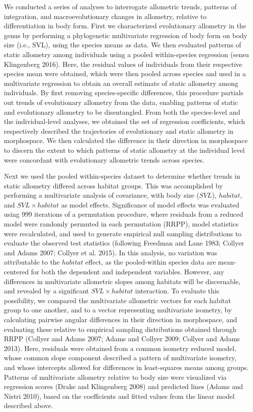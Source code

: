\documentclass[
  11pt,
]{article}
\begin{document}
We conducted a series of analyses to interrogate allometric trends,
patterns of integration, and macroevolutionary changes in allometry,
relative to differentiation in body form. First we characterized
evolutionary allometry in the genus by performing a phylogenetic
multivariate regression of body form on body size (i.e., SVL), using the
species means as data. We then evaluated patterns of static allometry
among individuals using a pooled within-species regression (sensu
Klingenberg 2016). Here, the residual values of individuals from their
respective species mean were obtained, which were then pooled across
species and used in a multivariate regression to obtain an overall
estimate of static allometry among individuals. By first removing
species-specific differences, this procedure partials out trends of
evolutionary allometry from the data, enabling patterns of static and
evolutionary allometry to be disentangled. From both the species-level
and the individual-level analyses, we obtained the set of regression
coefficients, which respectively described the trajectories of
evolutionary and static allometry in morphospace. We then calculated the
difference in their direction in morphospace to discern the extent to
which patterns of static allometry at the individual level were
concordant with evolutionary allometric trends across species.
\hfill\break

Next we used the pooled within-species dataset to determine whether
trends in static allometry differed across habitat groups. This was
accomplished by performing a multivariate analysis of covariance, with
body size (\(SVL\)), \(habitat\), and \(SVL \times habitat\) as model
effects. Significance of model effects was evaluated using 999
iterations of a permutation procedure, where residuals from a reduced
model were randomly permuted in each permutation (RRPP), model
statistics were recalculated, and used to generate empirical null
sampling distributions to evaluate the observed test statistics
(following Freedman and Lane 1983; Collyer and Adams 2007; Collyer et
al. 2015). In this analysis, no variation was attributable to the
\(habitat\) effect, as the pooled-within species data are mean-centered
for both the dependent and independent variables. However, any
differences in multivariate allometric slopes among habitats will be
discernable, and revealed by a significant \(SVL \times habitat\)
interaction. To evaluate this possibility, we compared the multivariate
allometric vectors for each habitat group to one another, and to a
vector representing multivariate isometry, by calculating pairwise
angular differences in their direction in morphospace, and evaluating
these relative to empirical sampling distributions obtained through RRPP
(Collyer and Adams 2007; Adams and Collyer 2009; Collyer and Adams
2013). Here, residuals were obtained from a common isometry reduced
model, whose common slope component described a pattern of multivariate
isometry, and whose intercepts allowed for differences in least-squares
means among groups. Patterns of multivariate allometry relative to body
size were visualized via regression scores (Drake and Klingenberg 2008)
and predicted lines (Adams and Nistri 2010), based on the coefficients
and fitted values from the linear model described above. \hfill\break
\end{document}
